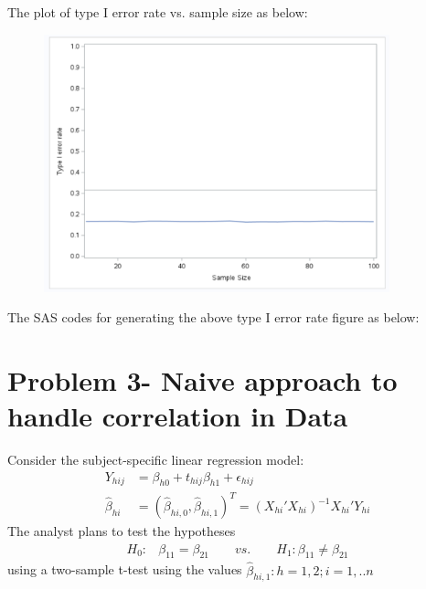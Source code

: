 \documentclass[11pt]{article} %
\begin{document}
\begin{itemize}
The plot of type I error rate vs. sample size as below:
\begin{figure}[h]
	\includegraphics[width=10cm]{HW1-2b.png}
\end{figure}

The SAS codes for generating the above type I error rate figure as below:


\end{itemize}

\section{Problem 3- Naive approach to handle correlation in Data}

Consider the subject-specific linear regression model:
\begin{align*}
	Y_{hij}  &= \beta_{h0} + t_{hij} \beta_{h1} + \epsilon_{hij} \\
	\hat{\beta}_{hi} &= (\hat{\beta}_{hi,0}, \hat{\beta}_{hi,1})^T = (X_{hi}' X_{hi})^{-1} X_{hi}' Y_{hi}
\end{align*}
The analyst plans to test the hypotheses 
\begin{align*}
	H_0:   & \beta_{11} = \beta_{21} \qquad vs. \qquad H_1: \beta_{11} \neq \beta_{21}
\end{align*}
using a two-sample t-test using the values $\hat{\beta}_{hi,1}: h= 1,2 ; i= 1,..n $ 
\end{document}
